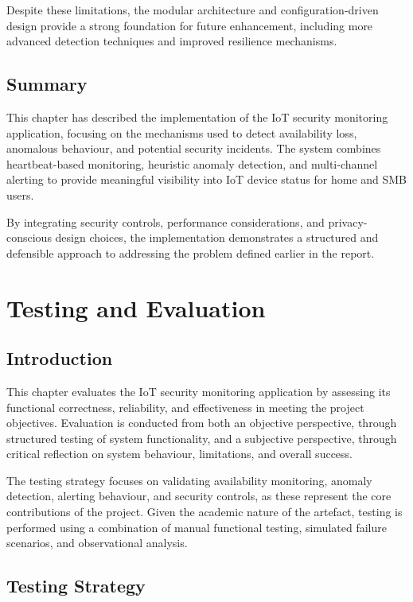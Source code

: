 Despite these limitations, the modular architecture and configuration-driven design provide a strong foundation for future enhancement, including more advanced detection techniques and improved resilience mechanisms.

\section{Summary}

This chapter has described the implementation of the IoT security monitoring application, focusing on the mechanisms used to detect availability loss, anomalous behaviour, and potential security incidents. The system combines heartbeat-based monitoring, heuristic anomaly detection, and multi-channel alerting to provide meaningful visibility into IoT device status for home and SMB users.

By integrating security controls, performance considerations, and privacy-conscious design choices, the implementation demonstrates a structured and defensible approach to addressing the problem defined earlier in the report.

\chapter{Testing and Evaluation}

\section{Introduction}

This chapter evaluates the IoT security monitoring application by assessing its functional correctness, reliability, and effectiveness in meeting the project objectives. Evaluation is conducted from both an objective perspective, through structured testing of system functionality, and a subjective perspective, through critical reflection on system behaviour, limitations, and overall success.

The testing strategy focuses on validating availability monitoring, anomaly detection, alerting behaviour, and security controls, as these represent the core contributions of the project. Given the academic nature of the artefact, testing is performed using a combination of manual functional testing, simulated failure scenarios, and observational analysis.

\section{Testing Strategy}

